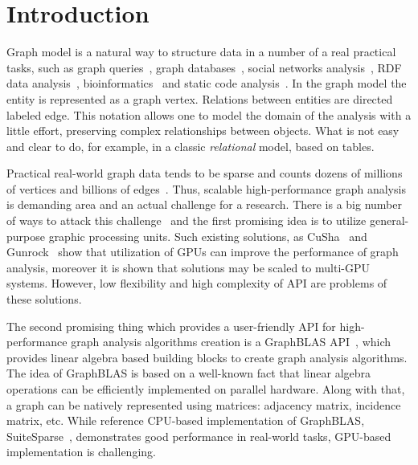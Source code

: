 \section*{Introduction}

Graph model is a natural way to structure data in a number of a real practical tasks, such as graph queries~\cite{article:querying_graph_databases}, graph databases~\cite{paper:redisgraph}, social networks analysis~\cite{article:facebook_large_scale}, RDF data analysis~\cite{article:cfpq_and_rdf_analysis}, bioinformatics~\cite{article:rna_prediction} and static code analysis~\cite{article:dyck_cfl_code_analysis}. In the graph model the entity is represented as a graph vertex. Relations between entities are directed labeled edge. This notation allows one to model the domain of the analysis with a little effort, preserving complex relationships between objects. What is not easy and clear to do, for example, in a classic \textit{relational} model, based on tables.

Practical real-world graph data tends to be sparse and counts dozens of millions of vertices and billions of edges~\cite{article:facebook_large_scale}. Thus, scalable high-performance graph analysis is demanding area and an actual challenge for a research. There is a big number of ways to attack this challenge~\cite{article:graph_landscape} and the first promising idea is to utilize general-purpose graphic processing units. Such existing solutions, as CuSha~\cite{article:cusha} and Gunrock~\cite{article:gunrock} show that utilization of GPUs can improve the performance of graph analysis, moreover it is shown that solutions may be scaled to multi-GPU systems. However, low flexibility and high complexity of API are problems of these solutions.

The second promising thing which provides a user-friendly API for high-performance graph analysis algorithms creation is a GraphBLAS API~\cite{paper:graphblas_foundations}, which provides linear algebra based building blocks to create graph analysis algorithms. The idea of GraphBLAS is based on a well-known fact that linear algebra operations can be efficiently implemented on parallel hardware. Along with that, a graph can be natively represented using matrices: adjacency matrix, incidence matrix, etc. While reference CPU-based implementation of GraphBLAS, SuiteSparse~\cite{article:suite_sparse_for_graph_problems}, demonstrates good performance in real-world tasks, GPU-based implementation is challenging.

